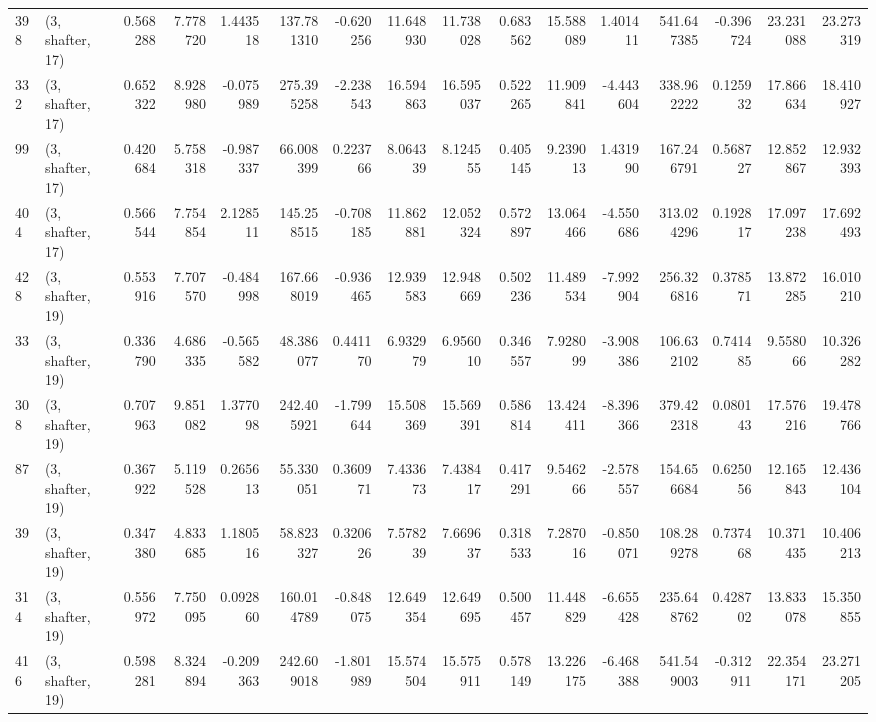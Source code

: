 \begin{tabular}{llrrrrrrrrrrrrrr}
398 &  (3, shafter, 17) &   0.568288 &   7.778720 &   1.443518 &   137.781310 &  -0.620256 &  11.648930 &  11.738028 &  0.683562 &  15.588089 &   1.401411 &   541.647385 &  -0.396724 &  23.231088 &  23.273319 \\
332 &  (3, shafter, 17) &   0.652322 &   8.928980 &  -0.075989 &   275.395258 &  -2.238543 &  16.594863 &  16.595037 &  0.522265 &  11.909841 &  -4.443604 &   338.962222 &   0.125932 &  17.866634 &  18.410927 \\
99  &  (3, shafter, 17) &   0.420684 &   5.758318 &  -0.987337 &    66.008399 &   0.223766 &   8.064339 &   8.124555 &  0.405145 &   9.239013 &   1.431990 &   167.246791 &   0.568727 &  12.852867 &  12.932393 \\
404 &  (3, shafter, 17) &   0.566544 &   7.754854 &   2.128511 &   145.258515 &  -0.708185 &  11.862881 &  12.052324 &  0.572897 &  13.064466 &  -4.550686 &   313.024296 &   0.192817 &  17.097238 &  17.692493 \\
428 &  (3, shafter, 19) &   0.553916 &   7.707570 &  -0.484998 &   167.668019 &  -0.936465 &  12.939583 &  12.948669 &  0.502236 &  11.489534 &  -7.992904 &   256.326816 &   0.378571 &  13.872285 &  16.010210 \\
33  &  (3, shafter, 19) &   0.336790 &   4.686335 &  -0.565582 &    48.386077 &   0.441170 &   6.932979 &   6.956010 &  0.346557 &   7.928099 &  -3.908386 &   106.632102 &   0.741485 &   9.558066 &  10.326282 \\
308 &  (3, shafter, 19) &   0.707963 &   9.851082 &   1.377098 &   242.405921 &  -1.799644 &  15.508369 &  15.569391 &  0.586814 &  13.424411 &  -8.396366 &   379.422318 &   0.080143 &  17.576216 &  19.478766 \\
87  &  (3, shafter, 19) &   0.367922 &   5.119528 &   0.265613 &    55.330051 &   0.360971 &   7.433673 &   7.438417 &  0.417291 &   9.546266 &  -2.578557 &   154.656684 &   0.625056 &  12.165843 &  12.436104 \\
39  &  (3, shafter, 19) &   0.347380 &   4.833685 &   1.180516 &    58.823327 &   0.320626 &   7.578239 &   7.669637 &  0.318533 &   7.287016 &  -0.850071 &   108.289278 &   0.737468 &  10.371435 &  10.406213 \\
314 &  (3, shafter, 19) &   0.556972 &   7.750095 &   0.092860 &   160.014789 &  -0.848075 &  12.649354 &  12.649695 &  0.500457 &  11.448829 &  -6.655428 &   235.648762 &   0.428702 &  13.833078 &  15.350855 \\
416 &  (3, shafter, 19) &   0.598281 &   8.324894 &  -0.209363 &   242.609018 &  -1.801989 &  15.574504 &  15.575911 &  0.578149 &  13.226175 &  -6.468388 &   541.549003 &  -0.312911 &  22.354171 &  23.271205 \\

\end{tabular}
